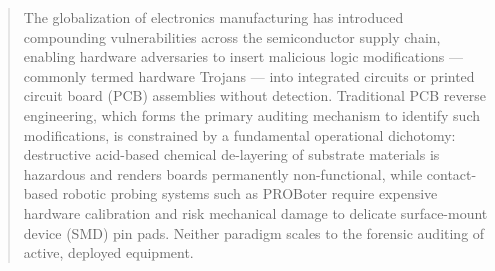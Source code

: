 \documentclass[12pt,a4paper]{report}
\begin{document}
\begin{abstract}

The globalization of electronics manufacturing has introduced compounding vulnerabilities across the semiconductor supply chain, enabling hardware adversaries to insert malicious logic modifications --- commonly termed hardware Trojans --- into integrated circuits or printed circuit board (PCB) assemblies without detection. Traditional PCB reverse engineering, which forms the primary auditing mechanism to identify such modifications, is constrained by a fundamental operational dichotomy: destructive acid-based chemical de-layering of substrate materials is hazardous and renders boards permanently non-functional, while contact-based robotic probing systems such as PROBoter require expensive hardware calibration and risk mechanical damage to delicate surface-mount device (SMD) pin pads. Neither paradigm scales to the forensic auditing of active, deployed equipment.


\end{abstract}
\end{document}
